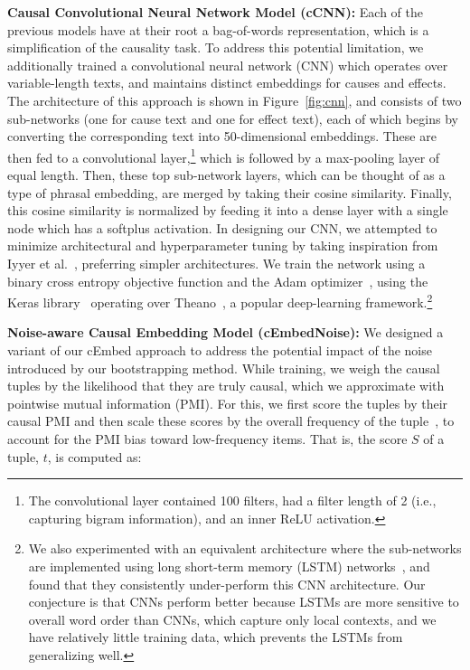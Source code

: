 {\flushleft \textbf{Causal Convolutional Neural Network Model (cCNN):}}
Each of the previous models have at their root a bag-of-words representation, which is a simplification of the causality task. To address this potential limitation, we additionally trained a convolutional neural network (CNN) which operates over variable-length texts, and maintains distinct embeddings for causes and effects.  The architecture of this approach is shown in Figure~\ref{fig:cnn}, and consists of two sub-networks (one for cause text and one for effect text), each of which begins by converting the corresponding text 
into 50-dimensional embeddings.  These are then fed to a convolutional layer,\footnote{The convolutional layer contained 100 filters, had a filter length of 2 (i.e., capturing bigram information), and an inner ReLU activation.} which is followed by a max-pooling layer of equal length.
Then, these top sub-network layers, which can be thought of as a type of phrasal embedding, are merged by taking their cosine similarity.  Finally, this cosine similarity is normalized by feeding it into a dense layer with a single node which has a softplus activation.  
In designing our CNN, we attempted to minimize architectural and hyperparameter tuning by taking inspiration from Iyyer et al.~\citeyear{iyyer2015deep}, preferring simpler architectures.
We train the network using a binary cross entropy objective function and the Adam optimizer~\cite{kingma2014adam}, using the Keras library~\cite{chollet2015keras} operating over Theano~\cite{2016arXiv160502688short}, a popular deep-learning framework.\footnote{We also experimented with an equivalent architecture where the sub-networks are implemented using long short-term memory (LSTM) networks~\cite{hochreiter1997long}, and found that they consistently under-perform this CNN architecture. Our conjecture is that CNNs perform better because LSTMs are more sensitive to overall word order than CNNs, which capture only local contexts, and we have relatively little training data, which prevents the LSTMs from generalizing well.}

{\flushleft \textbf{Noise-aware Causal Embedding Model (cEmbedNoise):}} 
We designed a variant of our cEmbed approach to address the potential impact of the noise introduced by our bootstrapping method.
While training, we weigh the causal tuples by the likelihood that they are truly causal, which we approximate with pointwise mutual information (PMI).
For this, we first score the tuples by their causal PMI and then scale these scores by the overall frequency of the tuple~\cite{riloff1996automatically}, to account for the PMI bias toward low-frequency items.  That is, the score $S$ of a tuple, $t$, is computed as: 

